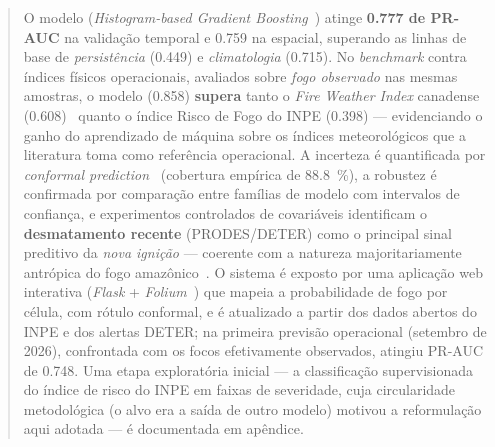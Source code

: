 \documentclass[tcc2]{uftex}
\begin{document}
\begin{abstract}
O modelo (\emph{Histogram-based Gradient Boosting}~\cite{friedman2001greedy}) atinge \textbf{\num{0,777} de PR-AUC} na validação temporal e \num{0,759} na espacial, superando as linhas de base de \emph{persistência} (\num{0,449}) e \emph{climatologia} (\num{0,715}). No \emph{benchmark} contra índices físicos operacionais, avaliados sobre \emph{fogo observado} nas mesmas amostras, o modelo (\num{0,858}) \textbf{supera} tanto o \emph{Fire Weather Index} canadense (\num{0,608})~\cite{vanwagner1985fwi} quanto o índice Risco de Fogo do INPE (\num{0,398}) --- evidenciando o ganho do aprendizado de máquina sobre os índices meteorológicos que a literatura toma como referência operacional. A incerteza é quantificada por \emph{conformal prediction}~\cite{sadinle2019lac} (cobertura empírica de \SI{88,8}{\percent}), a robustez é confirmada por comparação entre famílias de modelo com intervalos de confiança, e experimentos controlados de covariáveis identificam o \textbf{desmatamento recente} (PRODES/DETER) como o principal sinal preditivo da \emph{nova ignição} --- coerente com a natureza majoritariamente antrópica do fogo amazônico~\cite{aragao2018amazon}. O sistema é exposto por uma aplicação web interativa (\emph{Flask} + \emph{Folium}~\cite{folium,leafletjs}) que mapeia a probabilidade de fogo por célula, com rótulo conformal, e é atualizado a partir dos dados abertos do INPE e dos alertas DETER; na primeira previsão operacional (setembro de 2026), confrontada com os focos efetivamente observados, atingiu PR-AUC de \num{0,748}. Uma etapa exploratória inicial --- a classificação supervisionada do índice de risco do INPE em faixas de severidade, cuja circularidade metodológica (o alvo era a saída de outro modelo) motivou a reformulação aqui adotada --- é documentada em apêndice.
  \end{abstract}
\end{document}
